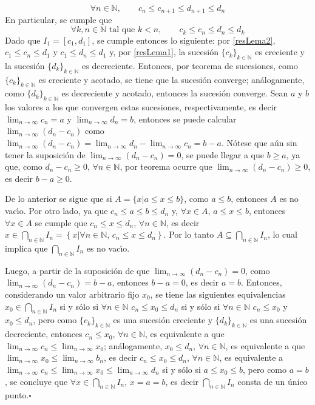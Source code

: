 \begin{solucion}
\begin{demostracion}
\begin{equation}
   \forall n\in \mathbb{N}, \qquad c_{n} \leq c_{n+1} \leq d_{n+1} \leq d_{n}
  \end{equation}
  En particular, se cumple que
  \begin{equation} \label{resLema2}
   \forall k,n\in \mathbb{N} \text{ tal que } k<n, \qquad c_k \leq c_n \leq d_n \leq d_k
  \end{equation}
  Dado que $I_1 = [c_1, d_1]$, se cumple entonces lo siguiente: por \eqref{resLema2}, $c_1 \leq c_n \leq d_1$ y $c_1 \leq d_n \leq d_1$ y, por \eqref{resLema1}, la sucesi\'on $\{ c_k \}_{k\in\mathbb{N}}$ es creciente y la sucesi\'on $\{ d_k \}_{k\in\mathbb{N}}$ es decreciente. Entonces, por teorema de sucesiones, como $\{ c_k \}_{k\in\mathbb{N}}$ es creciente y acotado, se tiene que la sucesi\'on converge; an\'alogamente, como $\{ d_k \}_{k\in\mathbb{N}}$ es decreciente y acotado, entonces la sucesi\'on converge. Sean $a$ y $b$ los valores a los que convergen estas sucesiones, respectivamente, es decir $\lim_{n\to \infty} c_n = a$ y $\lim_{n\to \infty} d_n = b$, entonces se puede calcular $\lim_{n\to \infty} (d_n - c_n)$ como $\lim_{n\to \infty} (d_n - c_n) = \lim_{n\to\infty} d_n - \lim_{n\to\infty} c_n = b - a$. N\'otese que a\'un sin tener la suposici\'on de $\lim_{n\to\infty} (d_n - c_n) = 0$, se puede llegar a que $b \geq a$, ya que, como $d_n - c_n \geq 0$, $\forall n \in \mathbb{N}$, por teorema ocurre que $\lim_{n\to\infty}(d_n - c_n) \geq 0$, es decir $b-a \geq 0$.
  \par 
  De lo anterior se sigue que si $A = \{ x | a \leq x \leq b \}$, como $a \leq b$, entonces $A$ es no vac\'{\i}o. Por otro lado, ya que $c_n \leq a \leq b \leq d_n$ y, $\forall x \in A$, $a \leq x \leq b$, entonces $\forall x\in A$ se cumple que $c_n \leq x \leq d_n$, $\forall n\in\mathbb{N}$, es decir $x\in \bigcap_{n\in\mathbb{N}} I_n = \left\{ x | \forall n \in \mathbb{N}, \, c_n \leq x \leq d_n \right\}$. Por lo tanto $A \subseteq \bigcap_{n \in \mathbb{N}} I_n$, lo cual implica que $\bigcap_{n\in\mathbb{N}} I_n$ es no vac\'{\i}o.
  \par 
  Luego, a partir de la suposici\'on de que $\lim_{n\to \infty} (d_n - c_n) = 0$, como $\lim_{n\to \infty} (d_n - c_n) = b-a$, entonces $b-a = 0$, es decir $a = b$. Entonces, considerando un valor arbitrario fijo $x_0$, se tiene las siguientes equivalencias $x_0 \in \bigcap_{n\in \mathbb{N}} I_n$ si y s\'olo si $\forall n \in \mathbb{N}$ $ c_n \leq x_0 \leq d_n$ si y s\'olo si $\forall n \in\mathbb{N}$ $c_n \leq x_0$ y $x_0 \leq d_n$, pero como $\{c_k\}_{k\in\mathbb{N}}$ es una sucesi\'on creciente y $\{d_k\}_{k\in\mathbb{N}}$ es una sucesi\'on decreciente, entonces $c_n \leq x_0$, $\forall n\in\mathbb{N}$, es equivalente a que $\lim_{n\to\infty} c_n \leq \lim_{n\to\infty} x_0$; an\'alogamente, $x_0 \leq d_n$, $\forall n \in\mathbb{N}$, es equivalente a que $\lim_{n\to\infty} x_0 \leq \lim_{n\to\infty} b_n$, es decir $c_n \leq x_0 \leq d_n$, $\forall n\in\mathbb{N}$, es equivalente a $\lim_{n\to\infty} c_n \leq \lim_{n\to\infty} x_0 \leq \lim_{n\to\infty} d_n$ si y s\'olo si $a \leq x_0 \leq b$, pero como $a=b$, se concluye que $\forall x \in \bigcap_{n\in\mathbb{N}} I_n$, $x = a= b$, es decir $\bigcap_{n\in\mathbb{N}} I_n$ consta de un \'unico punto.$\square$

\end{demostracion}
\end{solucion}
